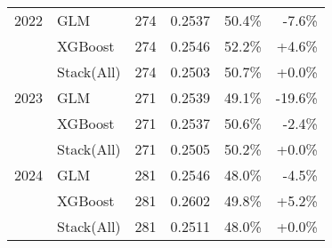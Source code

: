 \begin{table}[t]
\begin{tabular}{@{} c l r r r r @{} }
    2022 & GLM & 274 & 0.2537 & 50.4\% & -7.6\% \\
     & XGBoost & 274 & 0.2546 & 52.2\% & +4.6\% \\
     & Stack(All) & 274 & 0.2503 & 50.7\% & +0.0\% \\
    \midrule
    2023 & GLM & 271 & 0.2539 & 49.1\% & -19.6\% \\
     & XGBoost & 271 & 0.2537 & 50.6\% & -2.4\% \\
     & Stack(All) & 271 & 0.2505 & 50.2\% & +0.0\% \\
    \midrule
    2024 & GLM & 281 & 0.2546 & 48.0\% & -4.5\% \\
     & XGBoost & 281 & 0.2602 & 49.8\% & +5.2\% \\
     & Stack(All) & 281 & 0.2511 & 48.0\% & +0.0\% \\
    \bottomrule
  \end{tabular}
\end{table}

